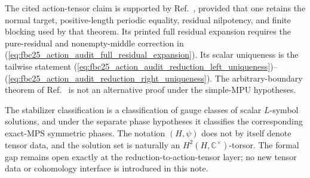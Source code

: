 \documentclass{article}
\begin{document}
The cited action-tensor claim is supported by
Ref.~\cite{Molnar2018SemiInjective}, provided that one retains the normal
target, positive-length periodic equality, residual nilpotency, and finite
blocking used by that theorem.  Its printed full residual expansion requires
the pure-residual and nonempty-middle correction in
(\ref{eq:fbc25_action_audit_full_residual_expansion}).  Its scalar uniqueness
is the tailwise
statement
(\ref{eq:fbc25_action_audit_reduction_left_uniqueness})--
(\ref{eq:fbc25_action_audit_reduction_right_uniqueness}).  The
arbitrary-boundary theorem of Ref.~\cite{GarreRubio2023MPOSym} is not an
alternative proof under the simple-MPU hypotheses.

The stabilizer classification is a classification of gauge classes of scalar
$L$-symbol solutions, and under the separate phase hypotheses it classifies
the corresponding exact-MPS symmetric phases.  The notation $(H,\psi)$ does
not by itself denote tensor data, and the solution set is naturally an
$H^2(H,\mathbb C^\times)$-torsor.  The formal gap remains open exactly at the
reduction-to-action-tensor layer; no new tensor data or cohomology interface is
introduced in this note.



\end{document}
